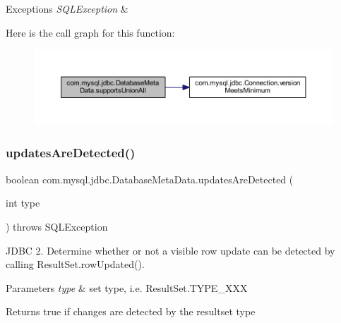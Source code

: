 \begin{DoxyExceptions}{Exceptions}
{\em S\+Q\+L\+Exception} & \\
\hline
\end{DoxyExceptions}
Here is the call graph for this function\+:
\nopagebreak
\begin{figure}[H]
\begin{center}
\leavevmode
\includegraphics[width=350pt]{classcom_1_1mysql_1_1jdbc_1_1_database_meta_data_aa427bf7fc40cc3eaf41dff0398592c52_cgraph}
\end{center}
\end{figure}
\mbox{\label{classcom_1_1mysql_1_1jdbc_1_1_database_meta_data_a59dee4ec20a09deed13ec6efcbe5a0dd}} 
\subsubsection{\texorpdfstring{updates\+Are\+Detected()}{updatesAreDetected()}}
{\footnotesize\ttfamily boolean com.\+mysql.\+jdbc.\+Database\+Meta\+Data.\+updates\+Are\+Detected (\begin{DoxyParamCaption}\item[{int}]{type }\end{DoxyParamCaption}) throws S\+Q\+L\+Exception}

J\+D\+BC 2. Determine whether or not a visible row update can be detected by calling Result\+Set.\+row\+Updated().


\begin{DoxyParams}{Parameters}
{\em type} & set type, i.\+e. Result\+Set.\+T\+Y\+P\+E\+\_\+\+X\+XX \\
\hline
\end{DoxyParams}
\begin{DoxyReturn}{Returns}
true if changes are detected by the resultset type 
\end{DoxyReturn}


